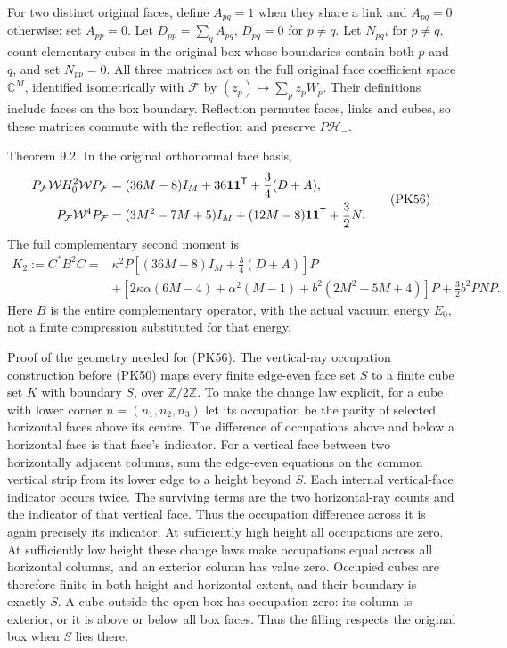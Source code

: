 \documentclass[11pt]{article}
\begin{document}
For two distinct original faces, define \(A_{pq}=1\) when they share a
link and \(A_{pq}=0\) otherwise; set \(A_{pp}=0\).
Let \(D_{pp}=\sum_qA_{pq}\), \(D_{pq}=0\) for \(p\ne q\).
Let \(N_{pq}\), for \(p\ne q\), count elementary cubes in the original box
whose boundaries contain both \(p\) and \(q\), and set \(N_{pp}=0\).
All three matrices act on the full original face coefficient space
\(\mathbb C^M\), identified isometrically with \(\mathcal F\) by
\((z_p)\mapsto\sum_pz_pW_p\). Their definitions include faces on the box
boundary. Reflection permutes faces, links and cubes, so these matrices
commute with the reflection and preserve \(P\mathcal H_-\).

Theorem 9.2. In the original orthonormal face basis,
\[
\begin{aligned}
 P_{\mathcal F}\mathcal W H_0^2\mathcal WP_{\mathcal F}
   &=(36M-8)I_M+36{\bf1}{\bf1}^{\mathsf T}
                       +\frac34(D+A),\\
 P_{\mathcal F}\mathcal W^4P_{\mathcal F}
   &=(3M^2-7M+5)I_M+(12M-8){\bf1}{\bf1}^{\mathsf T}
                       +\frac32N.
\end{aligned}\tag{PK56}
\]
The full complementary second moment is
\[
\begin{aligned}
 K_2:=C^*B^2C={}&
 \kappa^2P\left[(36M-8)I_M+\frac34(D+A)\right]P\\
 &+\left[2\kappa\alpha(6M-4)+\alpha^2(M-1)
                        +b^2(2M^2-5M+4)\right]P
 +\frac32b^2PNP.
\end{aligned}\tag{PK57}
\]
Here \(B\) is the entire complementary operator, with the actual vacuum
energy \(E_0\), not a finite compression substituted for that energy.

Proof of the geometry needed for (PK56).
The vertical-ray occupation construction before (PK50) maps every finite
edge-even face set \(S\) to a finite cube set \(K\) with boundary \(S\),
over \(\mathbb Z/2\mathbb Z\). To make the change law explicit, for a cube
with lower corner \(n=(n_1,n_2,n_3)\) let its occupation be the parity of
selected horizontal faces above its centre. The difference of occupations
above and below a horizontal face is that face's indicator. For a vertical
face between two horizontally adjacent columns, sum the edge-even equations
on the common vertical strip from its lower edge to a height beyond \(S\).
Each internal vertical-face indicator occurs twice. The surviving terms
are the two horizontal-ray counts and the indicator of that vertical face.
Thus the occupation difference across it is again precisely its indicator.
At sufficiently high height all occupations are zero. At sufficiently low
height these change laws make occupations equal across all horizontal
columns, and an exterior column has value zero. Occupied cubes are therefore
finite in both height and horizontal extent, and their boundary is exactly
\(S\). A cube outside the open box has occupation zero: its column is exterior,
or it is above or below all box faces. Thus the filling respects the original
box when \(S\) lies there.
\end{document}
